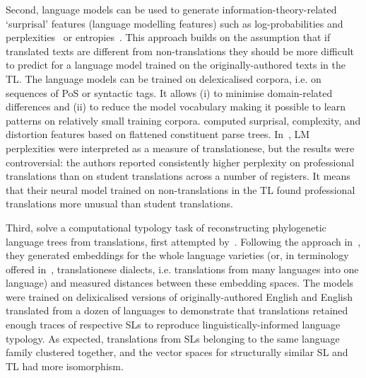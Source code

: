 Second, language models can be used to generate information-theory-related `surprisal' features (language modelling features) such as log-probabilities and perplexities~\cite{Rubino2016,Bizzoni2021,Pylypenko2021} or entropies~\cite{Nikolaev2020,Hu2021}. This approach builds on the assumption that if translated texts are different from non-translations they should be more difficult to predict for a language model trained on the originally-authored texts in the TL. The language models can be trained on delexicalised corpora, i.e. on sequences of PoS or syntactic tags. It allows (i) to minimise domain-related differences and (ii) to reduce the model vocabulary making it possible to learn patterns on relatively small training corpora. \citet{Rubino2016} computed surprisal, complexity, and distortion features based on flattened constituent parse trees.
In~\citet{Bizzoni2021}, \gls{LM} perplexities were interpreted as a measure of translationese, but the results were controversial: the authors reported consistently higher perplexity on professional translations than on student translations across a number of registers. It means that their neural model trained on non-translations in the TL found professional translations more unusual than student translations.


Third, \citet{Chowdhury2020,Chowdhury2021} solve a computational typology task of reconstructing phylogenetic language trees from translations, first attempted by~\citet{Rabinovich2017}. Following the approach in~\citet{Bjerva2019}, they generated embeddings for the whole language varieties (or, in terminology offered in~\cite{Koppel2011}, translationese dialects, i.e. translations from many languages into one language) and measured distances between these embedding spaces. The models were trained on delixicalised versions of originally-authored English and English translated from a dozen of languages to demonstrate that translations retained enough traces of respective SLs to reproduce linguistically-informed language typology. As expected, translations from SLs belonging to the same language family clustered together, and the vector spaces for structurally similar SL and TL had more isomorphism. 

